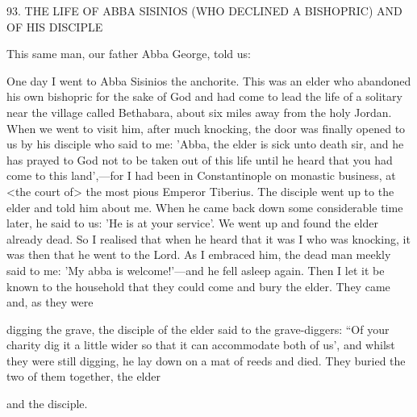 93. THE LIFE OF ABBA SISINIOS
(WHO DECLINED A BISHOPRIC)
AND OF HIS DISCIPLE

This same man, our father Abba George, told us:

One day I went to Abba Sisinios the anchorite. This was an elder
who abandoned his own bishopric for the sake of God and had
come to lead the life of a solitary near the village called Bethabara,
about six miles away from the holy Jordan. When we went to visit
him, after much knocking, the door was finally opened to us by his
disciple who said to me: 'Abba, the elder is sick unto death sir, and
he has prayed to God not to be taken out of this life until he heard
that you had come to this land',—for I had been in Constantinople
on monastic business, at <the court of> the most pious Emperor
Tiberius. The disciple went up to the elder and told him about me.
When he came back down some considerable time later, he said to
us: 'He is at your service'. We went up and found the elder already
dead. So I realised that when he heard that it was I who was
knocking, it was then that he went to the Lord. As I embraced him,
the dead man meekly said to me: 'My abba is welcome!'—and he
fell asleep again. Then I let it be known to the household that they
could come and bury the elder. They came and, as they were

digging the grave, the disciple of the elder said to the grave-diggers:
“Of your charity dig it a little wider so that it can accommodate
both of us', and whilst they were still digging, he lay down on a mat
of reeds and died. They buried the two of them together, the elder

and the disciple.

